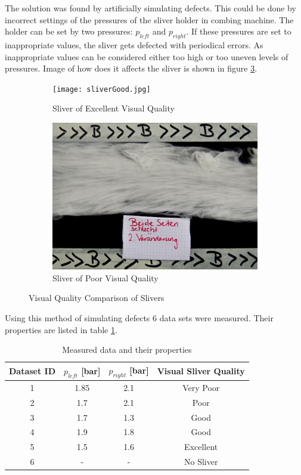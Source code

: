 \documentclass[twoside]{ctuthesis}
\theoremstyle{plain}
\theoremstyle{definition}
\theoremstyle{note}
\begin{document}
The solution was found by artificially simulating defects. This could be done by incorrect settings of the pressures of the sliver holder in combing machine. The holder can be set by two pressures: $p_{left}$ and $p_{right}$. If these pressures are set to inappropriate values, the sliver gets defected with periodical errors. As inappropriate values can be considered either too high or too uneven levels of pressures. Image of how does it affects the sliver is shown in figure \ref{fig:sliverComparison}.
\begin{figure}
	\centering
	\begin{subfigure}{0.5\textwidth}
		\centering
		\texttt{[image: sliverGood.jpg]}
		\caption{Sliver of Excellent Visual Quality}
		\label{fig:sliverGood}
	\end{subfigure}%
	\begin{subfigure}{0.5\textwidth}
		\centering
		\includegraphics[width=1.0\linewidth]{sliverBad.jpg}
		\caption{Sliver of Poor Visual Quality}
		\label{fig:sliverBad}
	\end{subfigure}
	\caption{Visual Quality Comparison of Slivers}
	\label{fig:sliverComparison}
\end{figure}
Using this method of simulating defects 6 data sets were measured. Their properties are listed in table \ref{tab:measuredData}.
\begin{table}[htbp]
	\centering
	\caption{Measured data and their properties}
	\begin{tabular}{cccc}
		\toprule
		Dataset ID & $p_{left}$ [bar] & $p_{right}$ [bar] & Visual Sliver Quality \\
		\midrule
		1     & 1.85  & 2.1   & Very Poor \\
		2     & 1.7   & 2.1   & Poor \\
		3     & 1.7   & 1.3   & Good \\
		4     & 1.9   & 1.8   & Good \\
		5     & 1.5   & 1.6   & Excellent \\
		6     & -     & -     & No Sliver \\
		\bottomrule
	\end{tabular}%
	\label{tab:measuredData}%
\end{table}%
\end{document}

